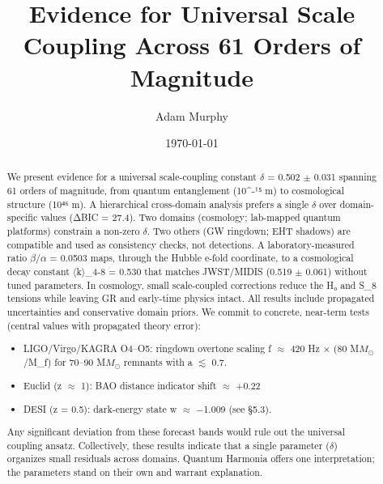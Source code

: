 \documentclass[aps,prd,preprint,onecolumn,nofootinbib,superscriptaddress,longbibliography]{revtex4-2}
\begin{document}
\title{Evidence for Universal Scale Coupling Across 61 Orders of Magnitude}

\author{Adam Murphy}

\date{\today}

\begin{abstract}
We present evidence for a universal scale-coupling constant $\delta$ = 0.502 $\pm$ 0.031 spanning 61 orders of magnitude, from quantum entanglement (10^{-}¹⁵ m) to cosmological structure (10⁴⁶ m). A hierarchical cross-domain analysis prefers a single $\delta$ over domain-specific values (ΔBIC = 27.4). Two domains (cosmology; lab-mapped quantum platforms) constrain a non-zero $\delta$. Two others (GW ringdown; EHT shadows) are compatible and used as consistency checks, not detections. A laboratory-measured ratio $\beta$/$\alpha$ = 0.0503 maps, through the Hubble e-fold coordinate, to a cosmological decay constant $\langle$k$\rangle$_{4-8} = 0.530 that matches JWST/MIDIS (0.519 $\pm$ 0.061) without tuned parameters. 
In cosmology, small scale-coupled corrections reduce the H₀ and S_8 tensions while leaving GR and early-time physics intact. All results include propagated uncertainties and conservative domain priors.
We commit to concrete, near-term tests (central values with propagated theory error):
\begin{itemize}
\item LIGO/Virgo/KAGRA O4--O5: ringdown overtone scaling f $\approx$ 420 Hz × (80 M$M_\odot$/M\_f) for 70--90 M$M_\odot$ remnants with a\* $\lesssim$ 0.7.
\item Euclid (z $\approx$ 1): BAO distance indicator shift $\approx$ +0.22%
\item DESI (z = 0.5): dark-energy state w $\approx$ −1.009 (see §5.3).
\end{itemize}
Any significant deviation from these forecast bands would rule out the universal coupling ansatz. Collectively, these results indicate that a single parameter ($\delta$) organizes small residuals across domains. Quantum Harmonia offers one interpretation; the parameters stand on their own and warrant explanation.
\end{abstract}


\maketitle
\end{document}
